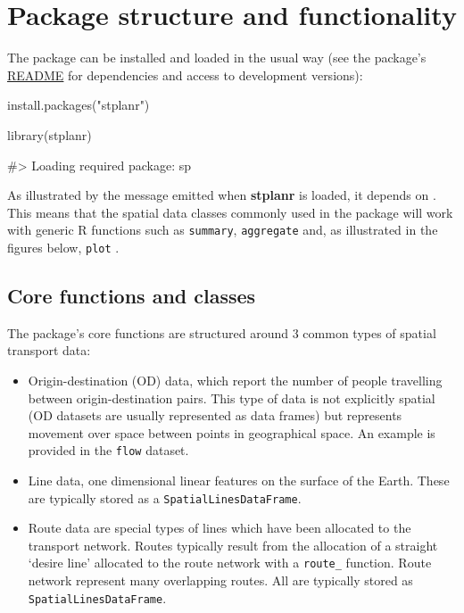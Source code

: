 \section{Package structure and
functionality}\label{package-structure-and-functionality}

The package can be installed and loaded in the usual way (see the
package's \href{https://github.com/ropensci/stplanr}{README} for
dependencies and access to development versions):

\begin{Schunk}
\begin{Sinput}
install.packages("stplanr")
\end{Sinput}
\end{Schunk}

\begin{Schunk}
\begin{Sinput}
library(stplanr)
\end{Sinput}
\begin{Soutput}
#> Loading required package: sp
\end{Soutput}
\end{Schunk}

As illustrated by the message emitted when \textbf{stplanr} is loaded,
it depends on . This means that the spatial data classes
commonly used in the package will work with generic R functions such as
\texttt{summary}, \texttt{aggregate} and, as illustrated in the figures
below, \texttt{plot} \citep{bivand_applied_2013}.

\subsection{Core functions and
classes}\label{core-functions-and-classes}

The package's core functions are structured around 3 common types of
spatial transport data:

\begin{itemize}
\tightlist
\item
  Origin-destination (OD) data, which report the number of people
  travelling between origin-destination pairs. This type of data is not
  explicitly spatial (OD datasets are usually represented as data
  frames) but represents movement over space between points in
  geographical space. An example is provided in the \texttt{flow}
  dataset.
\item
  Line data, one dimensional linear features on the surface of the
  Earth. These are typically stored as a \texttt{SpatialLinesDataFrame}.
\item
  Route data are special types of lines which have been allocated to the
  transport network. Routes typically result from the allocation of a
  straight `desire line' allocated to the route network with a
  \texttt{route\_} function. Route network represent many overlapping
  routes. All are typically stored as \texttt{SpatialLinesDataFrame}.
\end{itemize}

